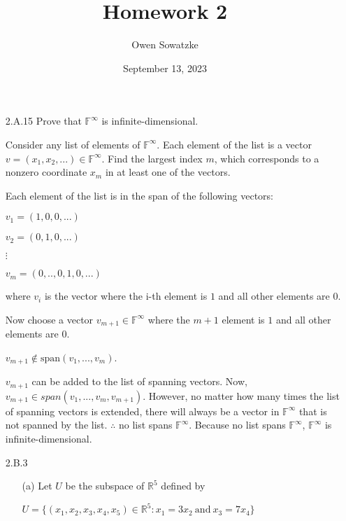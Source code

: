 \documentclass[fleqn]{article}
\title{Homework 2}
\author{Owen Sowatzke}
\date{September 13, 2023}
\begin{document}
	\doublespacing
	\setlength{\abovedisplayskip}{0pt}
	\setlength{\belowdisplayskip}{0pt}
	\setlength{\abovedisplayshortskip}{0pt}
	\setlength{\belowdisplayshortskip}{0pt}
	\setlength{\mathindent}{0pt}
	\maketitle
				
	\begin{enumerate}[nolistsep]
	
		\item[2.A.15] Prove that $\mathbb{F}^\infty$ is infinite-dimensional.
		
		Consider any list of elements of $\mathbb{F}^\infty$. Each element of the list is a vector $v = (x_1, x_2, ...) \in \mathbb{F}^\infty$. Find the largest index $m$, which corresponds to a nonzero coordinate $x_m$ in at least one of the vectors.
		
		 Each element of the list is in the span of the following vectors:
		 
		 $v_1 = (1, 0, 0, ...)$
		 
		 $v_2 = (0, 1, 0, ...)$
		 
		 $\vdots$
		 
		 $v_m = (0, .., 0, 1, 0, ...)$
		 
		 where $v_i$ is the vector where the i-th element is $1$ and all other elements are $0$.
		 
		 Now choose a vector $v_{m+1} \in \mathbb{F}^\infty$ where the $m + 1$ element is $1$ and all other elements are $0$.
		 
		 $v_{m+1} \not\in \text{span}(v_1, ..., v_m)$.
		 
		 $v_{m+1}$ can be added to the list of spanning vectors. Now, $v_{m+1} \in span(v_1, ..., v_m, v_{m+1})$. However, no matter how many times the list of spanning vectors is extended, there will always be a vector in $\mathbb{F}^\infty$ that is not spanned by the list. $\therefore$ no list spans $\mathbb{F}^\infty$. Because no list spans $\mathbb{F}^\infty$, $\mathbb{F}^\infty$ is infinite-dimensional.
		
		\item[2.B.3]
		
		 	\begin{enumerate}[nolistsep]
		 	
		 		\item[(a)] Let $U$ be the subspace of $\mathbb{R}^5$ defined by
		
				$U = \{(x_1, x_2, x_3, x_4, x_5) \in \mathbb{R}^5 : x_1 = 3x_2\ \text{and}\ x_3 = 7x_4\}$
		

\end{enumerate}
\end{enumerate}
\end{document}
